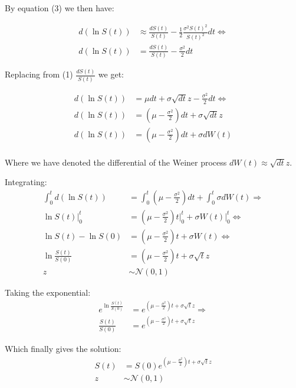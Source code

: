 \documentclass{article}
\begin{document}
By equation (3) we then have:

\begin{equation}
  \begin{aligned}
    d \left( \ln{S(t)} \right) & \approx \frac{dS(t)}{S(t)} - \frac{1}{2} \frac{{\sigma}^2 {S(t)}^2}{{S(t)}^2} dt \Leftrightarrow \\
    d \left( \ln{S(t)} \right) & = \frac{dS(t)}{S(t)} - \frac{{\sigma}^2 }{2} dt
  \end{aligned}
\end{equation}

Replacing from (1) $\frac{dS(t)}{S(t)}$ we get:

\begin{equation}
  \begin{aligned}
    d \left( \ln{S(t)} \right) & = \mu dt + \sigma \sqrt{dt} z - \frac{{\sigma}^2 }{2} dt \Leftrightarrow \\
    d \left( \ln{S(t)} \right) & = \left( \mu - \frac{{\sigma}^2 }{2} \right) dt + \sigma \sqrt{dt} z \\
    d \left( \ln{S(t)} \right) & = \left( \mu - \frac{{\sigma}^2 }{2} \right) dt + \sigma dW(t) \\
  \end{aligned}
\end{equation}

Where we have denoted the differential of the Weiner process $dW(t) \approx \sqrt{dt} z$.

Integrating:
\begin{equation}
  \begin{aligned}
    \int_{0}^{t} d \left( \ln{S(t)} \right) & = \int_{0}^{t} \left( \mu - \frac{{\sigma}^2 }{2} \right) dt + \int_{0}^{t} \sigma dW(t) \Rightarrow \\
    \ln{S(t)} \Big|_{0}^{t} & = \left( \mu - \frac{{\sigma}^2 }{2} \right) t \Big|_{0}^{t} + \sigma W(t) \Big|_{0}^{t} \Leftrightarrow \\
    \ln{S(t)} - \ln{S(0)} & = \left( \mu - \frac{{\sigma}^2 }{2} \right) t + \sigma W(t) \Leftrightarrow \\
    \ln{\frac{S(t)}{S(0)}} & = \left( \mu - \frac{{\sigma}^2 }{2} \right) t + \sigma \sqrt{t} z \\
    z & \sim \mathcal{N}(0,1)
  \end{aligned}
\end{equation}

Taking the exponential:
\begin{equation}
  \begin{aligned}
    e^{\ln{\frac{S(t)}{S(0)}}} & = e^{\left( \mu - \frac{{\sigma}^2 }{2} \right) t + \sigma \sqrt{t} z} \Rightarrow \\
    \frac{S(t)}{S(0)} & = e^{\left( \mu - \frac{{\sigma}^2 }{2} \right) t + \sigma \sqrt{t} z}
  \end{aligned}
\end{equation}

Which finally gives the solution:
\begin{equation}
  \begin{aligned}
    S(t) & = S(0) e^{\left( \mu - \frac{{\sigma}^2 }{2} \right) t + \sigma \sqrt{t} z} \\
    z & \sim \mathcal{N}(0,1)
  \end{aligned}
\end{equation}
\end{document}

